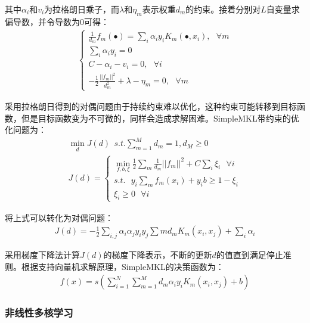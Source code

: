 其中$\alpha_{i}$和$v_{i}$为拉格朗日乘子，而$\lambda$和$\eta_{m}$表示权重$d_{m}$的约束。接着分别对$L$自变量求偏导数，并令导数为0可得：%
\begin{eqnarray}
\left\{ \begin{array}{l}\frac{1}{d_{m}}f_{m}(\bullet)=\sum_{i}\alpha_{i}y_{i}K_{m}(\bullet,x_{i}), ~~~ \forall m\\
\sum_{i}\alpha_{i}y_{i}=0\\
C-\alpha_{i}-v_{i}=0, ~~~ \forall i\\
-\frac{1}{2}\frac{||f_{m}||^{2}}{d^{2}_{m}}+\lambda-\eta_{m}=0, ~~~ \forall m\end{array} \right.
\end{eqnarray}

采用拉格朗日得到的对偶问题由于持续约束难以优化，这种约束可能转移到目标函数，但是目标函数变为不可微的，同样会造成求解困难。SimpleMKL带约束的优化问题为：
\begin{eqnarray}
\min_{d}J(d) ~~ s.t. \sum^{M}_{m=1}d_{m}=1,d_{M}\ge 0\\
J(d)=\left\{\begin{array}{l}\min_{{f},b,\xi}\frac{1}{2}\sum_{m}\frac{1}{d_{m}}||f_{m}||^{2}+C\sum_{i}\xi_{i} ~~~ \forall i\\
s.t. ~~~ y_{i}\sum_{m}f_{m}(x_{i})+y_{i}b \ge 1-\xi_{i}\\
\xi_{i}\ge 0 ~~~ \forall i\end{array}\right.
\end{eqnarray}

将上式可以转化为对偶问题：
\begin{eqnarray}
J(d)=-\frac{1}{2}\sum_{i,j}\alpha_{i}\alpha_{j}y_{i}y_{j}\sum{m}d_{m}K_{m}(x_{i},x_{j})+\sum_{i}\alpha_{i}
\end{eqnarray}

采用梯度下降法计算$J(d)$的梯度下降表示，不断的更新$d$的值直到满足停止准则。根据支持向量机求解原理，SimpleMKL的决策函数为：
\begin{eqnarray}
f(x)=s(\sum^{N}_{i=1}\sum^{M}_{m=1}d_{m}\alpha_{i}y_{i}K_{m}(x_{i},x_{j})+b)
\end{eqnarray}

\subsubsection{非线性多核学习}

